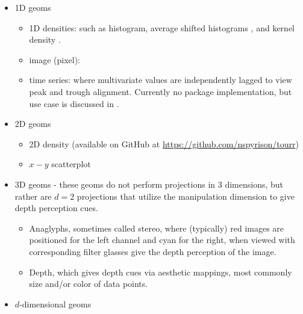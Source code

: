 \documentclass{monashthesis}
\begin{document}
\begin{itemize}
\tightlist
\item
  1D geoms

  \begin{itemize}
  \tightlist
  \item
    1D densities: such as histogram, average shifted histograms
    \autocite{scott_averaged_1985}, and kernel density
    \autocite{scott_incorporating_1995}.
  \item
    image (pixel): \autocite{wegman_pixel_2001}
  \item
    time series: where multivariate values are independently lagged to
    view peak and trough alignment. Currently no package implementation,
    but use case is discussed in \autocite{cook_manual_1997}.
  \end{itemize}
\item
  2D geoms

  \begin{itemize}
  \tightlist
  \item
    2D density (available on GitHub at
    \url{https://github.com/nspyrison/tourr})
  \item
    \(x-y\) scatterplot
  \end{itemize}
\item
  3D geoms - these geoms do not perform projections in 3 dimensions, but
  rather are \(d=2\) projections that utilize the manipulation dimension
  to give depth perception cues.

  \begin{itemize}
  \tightlist
  \item
    Anaglyphs, sometimes called stereo, where (typically) red images are
    positioned for the left channel and cyan for the right, when viewed
    with corresponding filter glasses give the depth perception of the
    image.
  \item
    Depth, which gives depth cues via aesthetic mappings, most commonly
    size and/or color of data points.
  \end{itemize}
\item
  \(d\)-dimensional geoms


\end{itemize}
\end{document}
